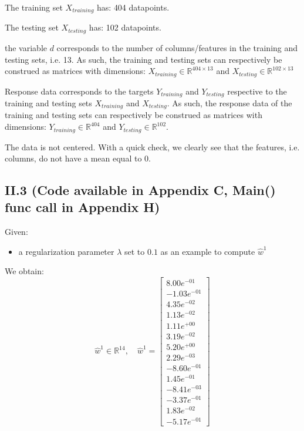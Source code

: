 \documentclass{homework}
\begin{document}
The training set $X_{training}$ has: \textcolor{OliveGreen}{404 datapoints}.

The testing set $X_{testing}$ has: \textcolor{OliveGreen}{102 datapoints}.

the variable $d$ corresponds to \textcolor{OliveGreen}{the number of columns/features in the training and testing sets, i.e. 13}. As such, the 
training and testing sets can respectively be construed as matrices with dimensions: $X_{training} \in \mathbb{R}^{404\times13}$ and 
$X_{testing} \in \mathbb{R}^{102\times13}$

Response data corresponds to \textcolor{OliveGreen}{the targets $Y_{training}$ and $Y_{testing}$ respective to the training and testing 
sets $X_{training}$ and $X_{testing}$}. As such, the response data of the training and testing sets can respectively be construed as matrices 
with dimensions: $Y_{training}\in\mathbb{R}^{404}$ 
and $Y_{testing}\in\mathbb{R}^{102}$.

The data is \textcolor{OliveGreen}{not centered}. With a quick check, we clearly see that the features, i.e. columns, do not have a mean equal to $0$.

\subsection*{II.3 (Code available in Appendix C, Main() func call in Appendix H)} 

Given:
\begin{itemize}
    \item a regularization parameter $\lambda$ set to $0.1$ as an example to compute $\hat{w}^1$
\end{itemize}
We obtain:
$$\hat{w}^1\in\mathbb{R}^{14},\quad\hat{w}^1 = \begin{bmatrix}
8.00e^{-01} \\ -1.03e^{-01} \\ 4.35e^{-02} \\ 1.13e^{-02} \\ 1.11e^{+00} \\ 3.19e^{-02} \\
5.20e^{+00} \\ 2.29e^{-03} \\ -8.60e^{-01} \\ 1.45e^{-01} \\ -8.41e^{-03} \\ -3.37e^{-01} \\
1.83e^{-02} \\ -5.17e^{-01}
\end{bmatrix}$$
\end{document}

